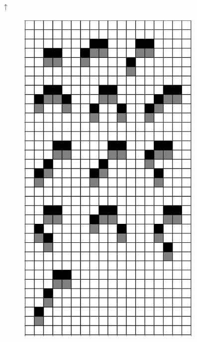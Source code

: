 \documentclass[12pt]{article}
\numberwithin{figure}{section} %
\begin{document}
\begin{figure}[H]
	\color{blue}
	\begin{center}
		{\Huge$\uparrow$}
	\end{center}
 	\begin{subfigure}{0.49\textwidth}
     		\centering
     		\includegraphics[width=\linewidth]{Section4/1.0}
   	\end{subfigure}

\end{figure}
\end{document}
